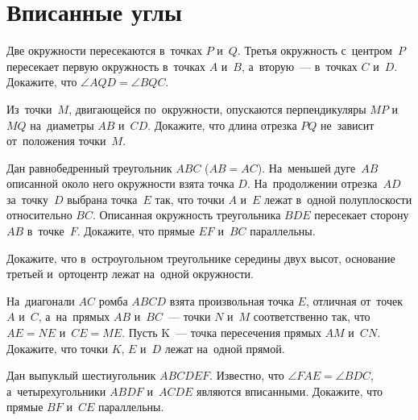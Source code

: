 
\section*{Вписанные углы}


\begin{problems}

\item
Две окружности пересекаются в~точках $P$ и~$Q$.
Третья окружность с~центром~$P$ пересекает первую окружность в~точках
$A$ и~$B$, а~вторую~--- в~точках $C$ и~$D$.
Докажите, что $\angle AQD = \angle BQC$.

\item
Из~точки~$M$, двигающейся по~окружности, опускаются перпендикуляры $MP$ и~$MQ$
на~диаметры $AB$ и~$CD$.
Докажите, что длина отрезка $PQ$ не~зависит от~положения точки~$M$.

\item
Дан равнобедренный треугольник $ABC$ ($AB = AC$).
На~меньшей дуге~$AB$ описанной около него окружности взята точка $D$.
На~продолжении отрезка~$AD$ за~точку~$D$ выбрана точка~$E$ так, что точки $A$
и~$E$ лежат в~одной полуплоскости относительно $BC$.
Описанная окружность треугольника $BDE$ пересекает сторону $AB$ в~точке~$F$.
Докажите, что прямые $EF$ и~$BC$ параллельны.


\item
Докажите, что в~остроугольном треугольнике середины двух высот, основание
третьей и~ортоцентр лежат на~одной окружности.

\item
На~диагонали $AC$ ромба $ABCD$ взята произвольная точка $E$, отличная от~точек
$A$ и~$C$, а~на~прямых $AB$ и~$BC$~--- точки $N$ и~$M$ соответственно так, что
$AE = NE$ и~$CE = ME$.
Пусть K~--- точка пересечения прямых $AM$ и~$CN$.
Докажите, что точки $K$, $E$ и~$D$ лежат на~одной прямой.

\item
Дан выпуклый шестиугольник $ABCDEF$.
Известно, что $\angle FAE = \angle BDC$, а~четырехугольники $ABDF$ и~$ACDE$
являются вписанными.
Докажите, что прямые $BF$ и~$CE$ параллельны.

\end{problems}

